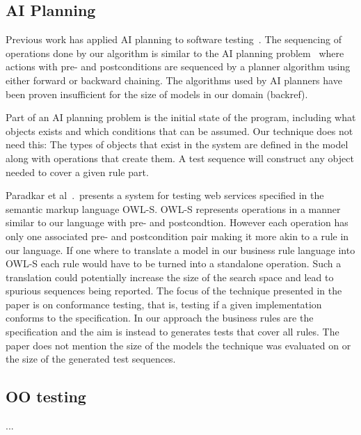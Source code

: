 \subsection{AI Planning}

Previous work has applied AI planning to software
testing~\cite{Scheetz99ai,Howe97testcase}. The sequencing of
operations done by our algorithm is similar to the AI planning
problem~\cite{Weld94} where actions with pre- and postconditions are sequenced
by a planner algorithm using either forward or backward chaining. The
algorithms used by AI planners have been proven insufficient for the
size of models in our domain (backref).

Part of an AI planning problem is the initial state of the program,
including what objects exists and which conditions that can be
assumed. Our technique does not need this: The types of objects that
exist in the system are defined in the model along with operations
that create them. A test sequence will construct any object needed to
cover a given rule part.

Paradkar et al~\cite{conf/icws/ParadkarSWJOSL07}.\ presents a system
for testing web services specified in the semantic markup language
OWL-S. OWL-S represents operations in a manner similar to our language
with pre- and postcondtion. However each operation has only one
associated pre- and postcondition pair making it more akin to a rule
in our language. If one where to translate a model in our business
rule language into OWL-S each rule would have to be turned into a
standalone operation. Such a translation could potentially increase the
size of the search space and lead to spurious sequences being
reported. The focus of the technique presented in the paper is on
conformance testing, that is, testing if a given implementation
conforms to the specification. In our approach the business rules are
the specification and the aim is instead to generates tests that cover
all rules. The paper does not mention the size of the models the
technique was evaluated on or the size of the generated test
sequences.

\subsection{OO testing}
 ...
